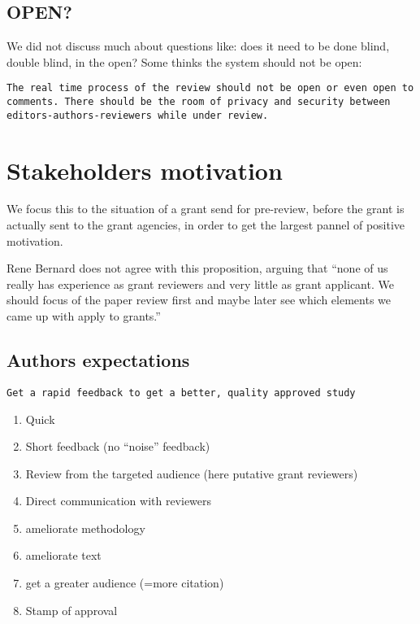\documentclass[]{article}
\begin{document}
\subsection{OPEN?}\label{open}

We did not discuss much about questions like: does it need to be done
blind, double blind, in the open? Some thinks the system should not be
open:

\begin{verbatim}
The real time process of the review should not be open or even open to comments. There should be the room of privacy and security between editors-authors-reviewers while under review.
\end{verbatim}

\section{Stakeholders motivation}\label{stakeholders-motivation}

We focus this to the situation of a grant send for pre-review, before
the grant is actually sent to the grant agencies, in order to get the
largest pannel of positive motivation.

Rene Bernard does not agree with this proposition, arguing that ``none
of us really has experience as grant reviewers and very little as grant
applicant. We should focus of the paper review first and maybe later see
which elements we came up with apply to grants.''

\subsection{Authors expectations}\label{authors-expectations}

\begin{verbatim}
Get a rapid feedback to get a better, quality approved study
\end{verbatim}

\begin{enumerate}
\def\labelenumi{\arabic{enumi}.}
\itemsep1pt\parskip0pt
\item
  Quick
\item
  Short feedback (no ``noise'' feedback)
\item
  Review from the targeted audience (here putative grant reviewers)
\item
  Direct communication with reviewers
\item
  ameliorate methodology
\item
  ameliorate text
\item
  get a greater audience (=more citation)
\item
  Stamp of approval
\end{enumerate}
\end{document}
